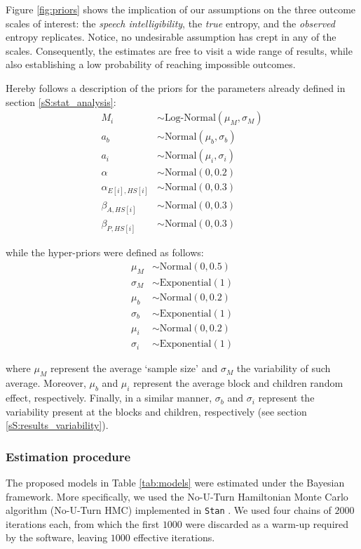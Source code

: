 Figure \ref{fig:priors} shows the implication of our assumptions on the three outcome scales of interest: the \textit{speech intelligibility}, the \textit{true} entropy, and the \textit{observed} entropy replicates. Notice, no undesirable assumption has crept in any of the scales. Consequently, the estimates are free to visit a wide range of results, while also establishing a low probability of reaching impossible outcomes.

Hereby follows a description of the priors for the parameters already defined in section \ref{sS:stat_analysis}:
%
\begin{align}
	M_{i} & \sim \text{Log-Normal}( \mu_{M}, \sigma_{M}) \\
	a_{b} & \sim \text{Normal}(\mu_{b}, \sigma_{b}) \\
	a_{i} & \sim \text{Normal}(\mu_{i}, \sigma_{i}) \\
	\alpha & \sim \text{Normal}(0, 0.2) \\
	\alpha_{E[i],HS[i]} & \sim \text{Normal}(0, 0.3) \\
	\beta_{A, HS[i]} & \sim \text{Normal}(0 , 0.3) \\
	\beta_{P, HS[i]} & \sim \text{Normal}(0, 0.3)
\end{align}

while the hyper-priors were defined as follows:
%
\begin{align}
	\mu_{M} & \sim \text{Normal}(0, 0.5) \\
	\sigma_{M} & \sim \text{Exponential}(1) \\
	\mu_{b} & \sim \text{Normal}(0, 0.2) \\
	\sigma_{b} & \sim \text{Exponential}(1) \\
	\mu_{i} & \sim \text{Normal}(0, 0.2) \\
	\sigma_{i} & \sim \text{Exponential}(1)
\end{align}

\noindent where $\mu_{M}$ represent the average `sample size' and $\sigma_{M}$ the variability of such average. Moreover, $\mu_{b}$ and $\mu_{i}$ represent the average block and children random effect, respectively. Finally, in a similar manner, $\sigma_{b}$ and $\sigma_{i}$ represent the variability present at the blocks and children, respectively (see section \ref{sS:results_variability}).
%
%
\subsubsection{Estimation procedure} \label{ssSA:model_estimation}
The proposed models in Table \ref{tab:models} were estimated under the Bayesian framework. More specifically, we used the No-U-Turn Hamiltonian Monte Carlo algorithm (No-U-Turn HMC) \citep{Betancourt_et_al_2013, Duane_et_al_1987, Hoffman_et_al_2014, Neal_2012} implemented in \texttt{Stan} \citep{Stan_2020}. We used four chains of $2000$ iterations each, from which the first $1000$ were discarded as a warm-up required by the software, leaving $1000$ effective iterations.

